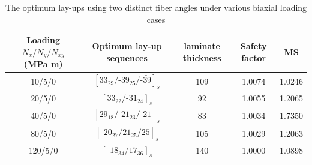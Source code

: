 \begin{table}
\caption{The optimum lay-ups using two distinct fiber angles under various biaxial loading cases}
\label{tab:two_distinct_angle}
\centering
\begin{tabular}{ccccc}
	\toprule
	Loading	$N_{x}/N_{y}/N_{xy}$ (MPa m)	       & Optimum lay-up sequences                                   & laminate thickness &  Safety factor  & MS\\
	\midrule
	10/5/0                                         &  $[33_{29}/\text{-}39_{25}/\bar{\text{-}39}]_s$            &     109               &  1.0074      &  1.0246  \\
	20/5/0                                         &  $[33_{22}/\text{-}31_{24}]_s$                             &     92               &  1.0055       &  1.2065    \\
	40/5/0                                         &  $[29_{18}/\text{-}21_{23}/\bar{\text{-}21}]_s$            &     83               &  1.0034       &  1.7350   \\
	80/5/0                                         &  $[\text{-}20_{27}/21_{25}/\bar{25}]_s$                    &     105               &  1.0029      &  1.2063    \\
	120/5/0                                         &  $[\text{-}18_{34}/17_{36}]_s$                            &     140               &  1.0000      &  1.0898    \\
	\bottomrule
\end{tabular}
\end{table}

